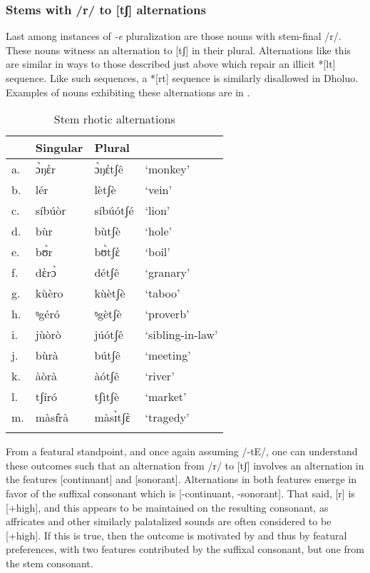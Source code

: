 \documentclass[output=paper,colorlinks,citecolor=brown]{langscibook}
\begin{document}
\subsubsection{Stems with /r/ to [tʃ] alternations}\largerpage

Last among instances of \textit{-e} pluralization are those nouns with stem-final /r/. These nouns witness an alternation to [tʃ] in their plural. Alternations like this are similar in ways to those described just above which repair an illicit *[lt] sequence. Like such sequences, a *[rt] sequence is similarly disallowed in Dholuo. Examples of nouns exhibiting these alternations are in .

\begin{table}
\caption{Stem rhotic alternations}
\label{tab:StemRhoticAlt}
 \begin{tabular}{llll}
  \lsptoprule
& Singular & Plural &  \\
\midrule
a.&	ɔ̀ŋὲr&	ɔ̀ŋέtʃê&	`monkey'\\
b.&	lér&	lètʃè	&`vein'\\
c.&	síbúòr&	síbúótʃé	&`lion'\\
d.&	bùr	&bùtʃè	&`hole'\\
e.&	bʊ̀r	&bʊ̀tʃὲ&	`boil'\\
f.	&dὲrɔ̀	&détʃê&	`granary'\\
g.&	kùèro	&kùètʃè&	`taboo'\\
h.&	ᵑgéró&	ᵑgètʃè	&`proverb'\\
i.&	jùòrò	&júótʃê	&`sibling-in-law'\\
j.&	bùrà	&bútʃê	&`meeting'\\
k.&àòrà	&àótʃê	&`river'\\
l.	&tʃíró&	tʃìtʃè&	`market'\\
m.&	màsɪ̂rà	&màsɪ̀tʃὲ	&`tragedy'\\
  \lspbottomrule
 \end{tabular}
\end{table}   

From a featural standpoint, and once again assuming /-tE/, one can understand these outcomes such that an alternation from /r/ to [tʃ] involves an alternation in the features [continuant] and [sonorant]. Alternations in both features emerge in favor of the suffixal consonant which is [-continuant, -sonorant]. That said, [r] is [+high], and this appears to be maintained on the resulting consonant, as affricates and other similarly palatalized sounds are often considered to be [+high]. If this is true, then the outcome is motivated by  and thus by featural preferences, with two features contributed by the suffixal consonant, but one from the stem consonant. 
\end{document}
